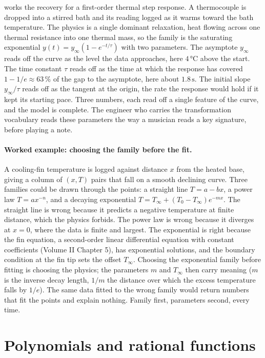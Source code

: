  works the recovery for a first-order
thermal step response. A thermocouple is dropped into a stirred bath
and its reading logged as it warms toward the bath temperature. The
physics is a single dominant relaxation, heat flowing across one
thermal resistance into one thermal mass, so the family is the
saturating exponential $y(t) = y_{\infty}(1 - e^{-t/\tau})$ with two
parameters. The asymptote $y_{\infty}$ reads off the curve as the
level the data approaches, here $4\,\si{\degreeCelsius}$ above the
start. The time constant $\tau$ reads off as the time at which the
response has covered $1 - 1/e \approx 63\,\%$ of the gap to the
asymptote, here about $1.8\,\si{\second}$. The initial slope
$y_{\infty}/\tau$ reads off as the tangent at the origin, the rate
the response would hold if it kept its starting pace. Three numbers,
each read off a single feature of the curve, and the model is
complete. The engineer who carries the transformation vocabulary
reads these parameters the way a musician reads a key signature,
before playing a note.

\paragraph{Worked example: choosing the family before the fit.}
A cooling-fin temperature is logged against distance $x$ from the
heated base, giving a column of $(x, T)$ pairs that fall on a smooth
declining curve. Three families could be drawn through the points: a
straight line $T = a - bx$, a power law $T = a x^{-n}$, and a decaying
exponential $T = T_{\infty} + (T_{0} - T_{\infty}) e^{-mx}$. The
straight line is wrong because it predicts a negative temperature at
finite distance, which the physics forbids. The power law is wrong
because it diverges at $x = 0$, where the data is finite and largest.
The exponential is right because the fin equation, a second-order
linear differential equation with constant coefficients (Volume II
Chapter 5), has exponential solutions, and the boundary condition at
the fin tip sets the offset $T_{\infty}$. Choosing the exponential
family before fitting is choosing the physics; the parameters
$m$ and $T_{\infty}$ then carry meaning ($m$ is the inverse decay
length, $1/m$ the distance over which the excess temperature falls by
$1/e$). The same data fitted to the wrong family would return numbers
that fit the points and explain nothing. Family first, parameters
second, every time.

\section{Polynomials and rational functions}

